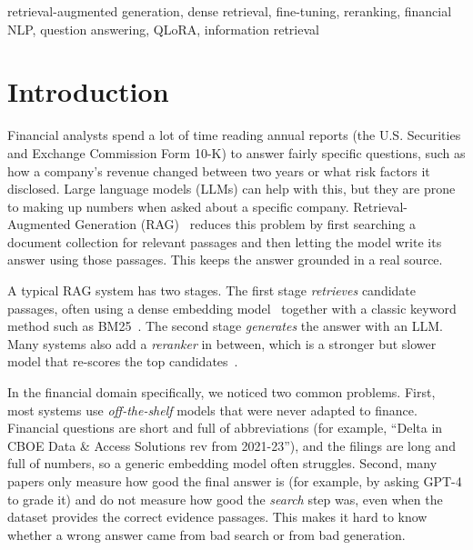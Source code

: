 \documentclass[conference]{IEEEtran}
\begin{document}
\begin{IEEEkeywords}
retrieval-augmented generation, dense retrieval, fine-tuning, reranking, financial NLP, question
answering, QLoRA, information retrieval
\end{IEEEkeywords}

\section{Introduction}
Financial analysts spend a lot of time reading annual reports (the U.S. Securities and Exchange
Commission Form 10-K) to answer fairly specific questions, such as how a company's revenue changed
between two years or what risk factors it disclosed. Large language models (LLMs) can help with this,
but they are prone to making up numbers when asked about a specific company. Retrieval-Augmented
Generation (RAG)~\cite{lewis2020rag} reduces this problem by first searching a document collection for
relevant passages and then letting the model write its answer using those passages. This keeps the
answer grounded in a real source.

A typical RAG system has two stages. The first stage \emph{retrieves} candidate passages, often using a
dense embedding model~\cite{karpukhin2020dpr} together with a classic keyword method such as
BM25~\cite{robertson2009bm25}. The second stage \emph{generates} the answer with an LLM. Many systems
also add a \emph{reranker} in between, which is a stronger but slower model that re-scores the top
candidates~\cite{nogueira2019passage}.

In the financial domain specifically, we noticed two common problems. First, most systems use
\emph{off-the-shelf} models that were never adapted to finance. Financial questions are short and full
of abbreviations (for example, ``Delta in CBOE Data \& Access Solutions rev from 2021-23''), and the
filings are long and full of numbers, so a generic embedding model often struggles. Second, many papers
only measure how good the final answer is (for example, by asking GPT-4 to grade it) and do not measure
how good the \emph{search} step was, even when the dataset provides the correct evidence passages. This
makes it hard to know whether a wrong answer came from bad search or from bad generation.
\end{document}
